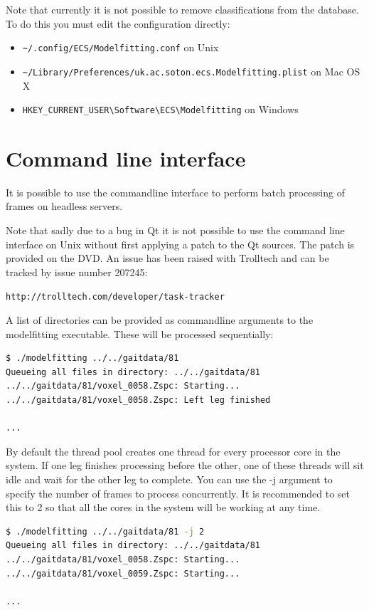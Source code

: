 Note that currently it is not possible to remove classifications from the database.
To do this you must edit the configuration directly:

\begin{itemize}
	\item \verb+~/.config/ECS/Modelfitting.conf+ on Unix
	\item \verb+~/Library/Preferences/uk.ac.soton.ecs.Modelfitting.plist+ on Mac OS X
	\item \verb+HKEY_CURRENT_USER\Software\ECS\Modelfitting+ on Windows
\end{itemize}



\section{Command line interface}
\label{manual:commandline}

It is possible to use the commandline interface to perform batch processing of frames on headless servers.

Note that sadly due to a bug in Qt it is not possible to use the command line interface on Unix without first applying a patch to the Qt sources.
The patch is provided on the DVD.
An issue has been raised with Trolltech and can be tracked by issue number 207245:

\verb+http://trolltech.com/developer/task-tracker+

\bigskip
\noindent A list of directories can be provided as commandline arguments to the modelfitting executable.
These will be processed sequentially:

\clearpage
\begin{lstlisting}[firstnumber=1,language=sh,frame=single]
$ ./modelfitting ../../gaitdata/81
Queueing all files in directory: ../../gaitdata/81
../../gaitdata/81/voxel_0058.Zspc: Starting...
../../gaitdata/81/voxel_0058.Zspc: Left leg finished

...
\end{lstlisting}

By default the thread pool creates one thread for every processor core in the system.
If one leg finishes processing before the other, one of these threads will sit idle and wait for the other leg to complete.
You can use the -j argument to specify the number of frames to process concurrently.
It is recommended to set this to 2 so that all the cores in the system will be working at any time.

\begin{lstlisting}[firstnumber=1,language=sh,frame=single]
$ ./modelfitting ../../gaitdata/81 -j 2
Queueing all files in directory: ../../gaitdata/81
../../gaitdata/81/voxel_0058.Zspc: Starting...
../../gaitdata/81/voxel_0059.Zspc: Starting...

...
\end{lstlisting}
